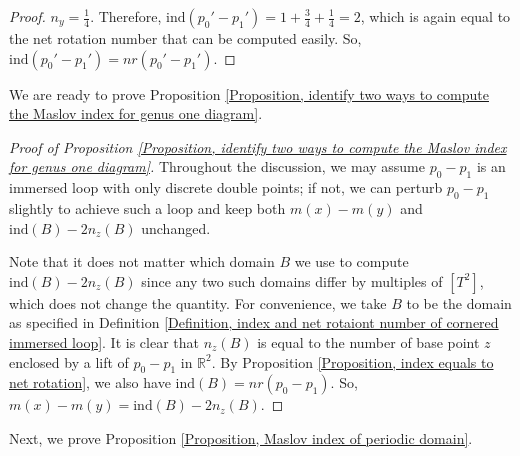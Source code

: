 \documentclass{amsart}
\theoremstyle{definition}
\theoremstyle{remark}
\numberwithin{equation}{section}
\numberwithin{equation}{section} \makeatletter
\begin{document}
\begin{proof}
$n_y=\frac{1}{4}$. Therefore, $\text{ind}(p_0'-p_1')=1+\frac{3}{4}+\frac{1}{4}=2$, which is again equal to the net rotation number that can be computed easily. So, $\text{ind}(p_0'-p_1')=nr(p_0'-p_1')$. 
\end{proof}

We are ready to prove Proposition \ref{Proposition, identify two ways to compute the Maslov index for genus one diagram}.
\begin{proof}[Proof of Proposition \ref{Proposition, identify two ways to compute the Maslov index for genus one diagram}]
Throughout the discussion, we may assume $p_0-p_1$ is an immersed loop with only discrete double points; if not, we can perturb $p_0-p_1$ slightly to achieve such a loop and keep both $m(x)-m(y)$ and $\text{ind}(B)-2n_z(B)$ unchanged. 

Note that it does not matter which domain $B$ we use to compute $\text{ind}(B)-2n_z(B)$ since any two such domains differ by multiples of $[T^2]$, which does not change the quantity. 
For convenience, we take $B$ to be the domain as specified in Definition \ref{Definition, index and net rotaiont number of cornered immersed loop}. It is clear that $n_z(B)$ is equal to the number of base point $z$ enclosed by a lift of $p_0-p_1$ in $\mathbb{R}^2$. By Proposition \ref{Proposition, index equals to net rotation}, we also have $\text{ind}(B)=nr(p_0-p_1)$. So, $m(x)-m(y)=\text{ind}(B)-2n_z(B)$. 
\end{proof}
Next, we prove Proposition \ref{Proposition, Maslov index of periodic domain}.
\end{document}
